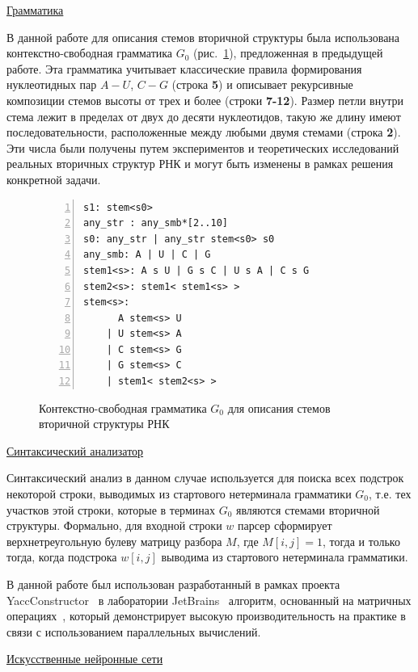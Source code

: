 \documentclass[14pt]{matmex-diploma-custom}
\begin{document}
\vspace{10pt}
\underline{Грамматика}

В данной работе для описания стемов вторичной структуры была использована контекстно-свободная грамматика $G_0$ (рис.~\ref{gram}), предложенная в предыдущей работе. Эта грамматика учитывает классические правила формирования нуклеотидных пар $A-U$, $C-G$ (строка \textbf{5}) и описывает рекурсивные композиции стемов высоты от трех и более (строки \textbf{7-12}). Размер петли внутри стема лежит в пределах от двух до десяти нуклеотидов, такую же длину имеют последовательности, расположенные между любыми двумя стемами (строка \textbf{2}). Эти числа были получены путем экспериментов и теоретических исследований реальных вторичных структур РНК и могут быть изменены в рамках решения конкретной задачи.

\begin{figure}[h]
\begin{Verbatim}[numbers=left,xleftmargin=5mm]
s1: stem<s0>
any_str : any_smb*[2..10]
s0: any_str | any_str stem<s0> s0
any_smb: A | U | C | G
stem1<s>: A s U | G s C | U s A | C s G 
stem2<s>: stem1< stem1<s> >
stem<s>:  
      A stem<s> U 
    | U stem<s> A 
    | C stem<s> G 
    | G stem<s> C 
    | stem1< stem2<s> >  
\end{Verbatim}
\caption{Контекстно-свободная грамматика $G_0$ для описания стемов вторичной структуры РНК}
\label{gram}
\end{figure}

\vspace{10pt}
\underline{Синтаксический анализатор}

Синтаксический анализ в данном случае используется для поиска всех подстрок некоторой строки, выводимых из стартового нетерминала грамматики $G_0$, т.е. тех участков этой строки, которые в терминах $G_0$ являются стемами вторичной структуры. Формально, для входной строки $w$ парсер сформирует верхнетреугольную булеву матрицу разбора $M$, где $M[i,j]=1$, тогда и только тогда, когда подстрока $w[i,j]$  выводима из стартового нетерминала грамматики. 

В данной работе был использован разработанный в рамках проекта YaccConstructor~\cite{yacc} в лаборатории JetBrains~\cite{jetbrains} алгоритм, основанный на матричных операциях~\cite{Azimov:2018:CPQ:3210259.3210264}, который демонстрирует высокую производительность на практике в связи с использованием параллельных вычислений.

\vspace{10pt}
\underline{Искусственные нейронные сети}
\end{document}
